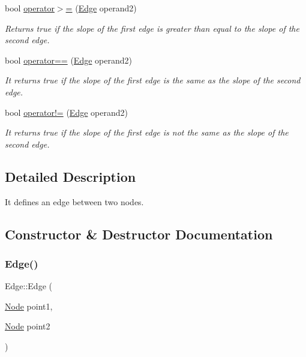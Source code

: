 \begin{DoxyCompactItemize}
bool \hyperlink{classEdge_a7b6040b38d6e8ff509f226b1d873d7f7}{operator$>$=} (\hyperlink{classEdge}{Edge} operand2)
\begin{DoxyCompactList}\small\item\em Returns true if the slope of the first edge is greater than equal to the slope of the second edge. \end{DoxyCompactList}\item 
bool \hyperlink{classEdge_a5e7b6b77b9afb78e404a9718ecd815fd}{operator==} (\hyperlink{classEdge}{Edge} operand2)
\begin{DoxyCompactList}\small\item\em It returns true if the slope of the first edge is the same as the slope of the second edge. \end{DoxyCompactList}\item 
bool \hyperlink{classEdge_acac0e7451c75c63ea8349a5f1acb9c2d}{operator!=} (\hyperlink{classEdge}{Edge} operand2)
\begin{DoxyCompactList}\small\item\em It returns true if the slope of the first edge is not the same as the slope of the second edge. \end{DoxyCompactList}\end{DoxyCompactItemize}


\subsection{Detailed Description}
It defines an edge between two nodes. 

\subsection{Constructor \& Destructor Documentation}
\mbox{\label{classEdge_a5930482e8b7cde1ed3b7009f3028a920}} 
\subsubsection{\texorpdfstring{Edge()}{Edge()}}
{\footnotesize\ttfamily Edge\+::\+Edge (\begin{DoxyParamCaption}\item[{\hyperlink{classNode}{Node}}]{point1,  }\item[{\hyperlink{classNode}{Node}}]{point2 }\end{DoxyParamCaption})}



